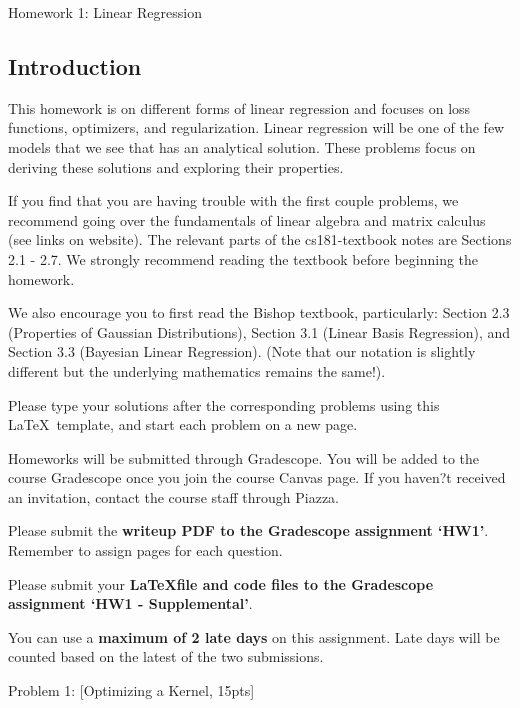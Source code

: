 \documentclass[submit]{harvardml}
\begin{document}
\begin{center}
{\Large Homework 1: Linear Regression}\\
\end{center}

\subsection*{Introduction}
This homework is on different forms of linear regression and focuses
on loss functions, optimizers, and regularization. Linear regression 
will be one of the few models that we see that has an analytical solution.
These problems focus on deriving these solutions and exploring their 
properties. 

If you find that you are having trouble with the first couple
problems, we recommend going over the fundamentals of linear algebra
and matrix calculus (see links on website).  The relevant parts of the
cs181-textbook notes are Sections 2.1 - 2.7.  We strongly recommend reading the textbook before beginning the homework.

We also encourage you to first read the Bishop
textbook, particularly: Section 2.3 (Properties of Gaussian
Distributions), Section 3.1 (Linear Basis Regression), and Section 3.3
(Bayesian Linear Regression). (Note that our notation is slightly different but
the underlying mathematics remains the same!).

Please type your solutions after the corresponding problems using this
\LaTeX\ template, and start each problem on a new page.

Homeworks will be submitted through Gradescope. You will be added to the course Gradescope once you join the course Canvas page. If you haven?t received an invitation, contact the course staff through Piazza.

Please submit the \textbf{writeup PDF to the Gradescope assignment `HW1'}. Remember to assign pages for each question. 

Please submit your \textbf{\LaTeX file and code files to the Gradescope assignment `HW1 - Supplemental'}. 

You can use a \textbf{maximum of 2 late days} on this assignment.  Late days will be counted based on the latest of the two submissions.
\\
\newpage

Problem 1: [Optimizing a Kernel, 15pts]
\end{document}
